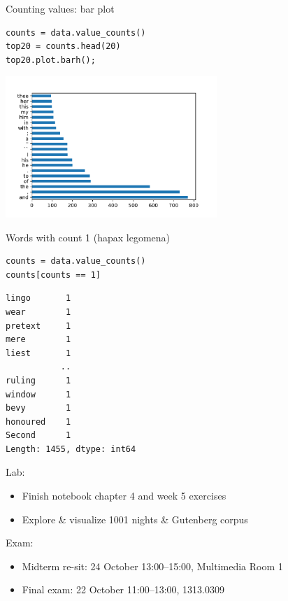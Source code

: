 \documentclass[aspectratio=169,usenames,dvipsnames]{beamer}
\begin{document}
\begin{frame}[fragile]{Counting values: bar plot}
\begin{lstlisting}
counts = data.value_counts()
top20 = counts.head(20)
top20.plot.barh();
\end{lstlisting}
\includegraphics[width=0.6\textwidth]{fig/barplotwords}
\end{frame}


\begin{frame}[fragile]{Words with count 1 (hapax legomena)}
\begin{lstlisting}
counts = data.value_counts()
counts[counts == 1]
\end{lstlisting}
\begin{lstlisting}[style=plain]
lingo       1
wear        1
pretext     1
mere        1
liest       1
           ..
ruling      1
window      1
bevy        1
honoured    1
Second      1
Length: 1455, dtype: int64
\end{lstlisting}
\end{frame}



\begin{frame}
Lab:
\begin{itemize}
    \item Finish notebook chapter 4 and week 5 exercises
    \item Explore \& visualize 1001 nights \& Gutenberg corpus
\end{itemize}

Exam:
    \begin{itemize}
        \item Midterm re-sit: 24 October 13:00--15:00, Multimedia Room 1
        \item Final exam: 22 October 11:00--13:00, 1313.0309
    \end{itemize}
\end{frame}
\end{document}

